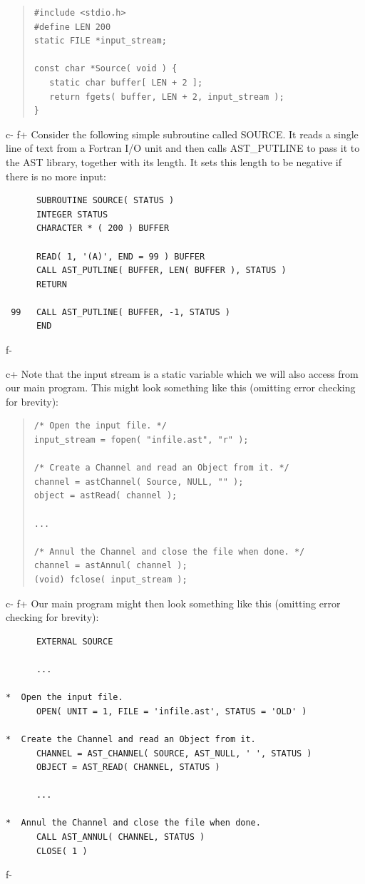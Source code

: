 \documentclass[twoside,11pt]{article}
\begin{document}
\begin{quote}
\small
\begin{verbatim}
#include <stdio.h>
#define LEN 200
static FILE *input_stream;

const char *Source( void ) {
   static char buffer[ LEN + 2 ];
   return fgets( buffer, LEN + 2, input_stream );
}
\end{verbatim}
\normalsize
\end{quote}
c-
f+
Consider the following simple subroutine called SOURCE. It reads a
single line of text from a Fortran I/O unit and then calls
AST\_PUTLINE to pass it to the AST library, together with its
length. It sets this length to be negative if there is no more input:

\small
\begin{verbatim}
      SUBROUTINE SOURCE( STATUS )
      INTEGER STATUS
      CHARACTER * ( 200 ) BUFFER

      READ( 1, '(A)', END = 99 ) BUFFER
      CALL AST_PUTLINE( BUFFER, LEN( BUFFER ), STATUS )
      RETURN

 99   CALL AST_PUTLINE( BUFFER, -1, STATUS )      
      END
\end{verbatim}
\normalsize
f-

c+
Note that the input stream is a static variable which we will also
access from our main program. This might look something like this
(omitting error checking for brevity):

\begin{quote}
\small
\begin{verbatim}
/* Open the input file. */
input_stream = fopen( "infile.ast", "r" );

/* Create a Channel and read an Object from it. */
channel = astChannel( Source, NULL, "" );
object = astRead( channel );

...

/* Annul the Channel and close the file when done. */
channel = astAnnul( channel );
(void) fclose( input_stream );
\end{verbatim}
\normalsize
\end{quote}
c-
f+
Our main program might then look something like this (omitting error
checking for brevity):

\small
\begin{verbatim}
      EXTERNAL SOURCE

      ...

*  Open the input file.
      OPEN( UNIT = 1, FILE = 'infile.ast', STATUS = 'OLD' )

*  Create the Channel and read an Object from it.
      CHANNEL = AST_CHANNEL( SOURCE, AST_NULL, ' ', STATUS )
      OBJECT = AST_READ( CHANNEL, STATUS )

      ...

*  Annul the Channel and close the file when done.
      CALL AST_ANNUL( CHANNEL, STATUS )
      CLOSE( 1 )
\end{verbatim}
\normalsize
f-
\end{document}
